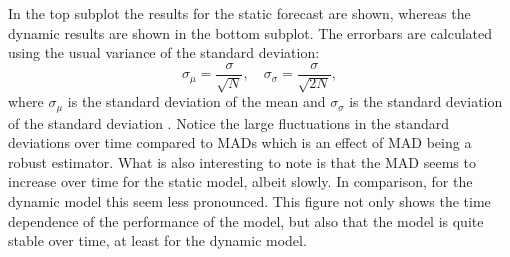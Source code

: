 In the top subplot the results for the static forecast are shown, whereas the dynamic results are shown in the bottom subplot. The errorbars are calculated using the usual variance of the standard deviation:
\begin{equation}
  \sigma_\mu  = \frac{\sigma}{\sqrt{N}}, \quad \sigma_\sigma = \frac{\sigma}{\sqrt{2N}},
\end{equation}
where $\sigma_\mu$ is the standard deviation of the mean and $\sigma_\sigma$ is the standard deviation of the standard deviation \autocite{Barlow:0471922951}.
Notice the large fluctuations in the standard deviations over time compared to MADs which is an effect of MAD being a robust estimator. What is also interesting to note is that the MAD seems to increase over time for the static model, albeit slowly. In comparison, for the dynamic model this seem less pronounced. This figure not only shows the time dependence of the performance of the model, but also that the model is quite stable over time, at least for the dynamic model. 

